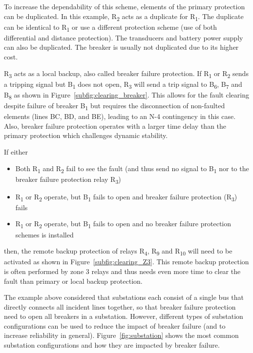 To increase the dependability of this scheme, elements of the primary protection can be duplicated. In this example, R\textsubscript{2} acts as a duplicate for R\textsubscript{1}. The duplicate can be identical to R\textsubscript{1} or use a different protection scheme (\eg use of both differential and distance protection). The transducers and battery power supply can also be duplicated. The breaker is usually not duplicated due to its higher cost.

R\textsubscript{3} acts as a local backup, also called breaker failure protection. If R\textsubscript{1} or R\textsubscript{2} sends a tripping signal but B\textsubscript{1} does not open, R\textsubscript{3} will send a trip signal to B\textsubscript{6}, B\textsubscript{7} and B\textsubscript{8} as shown in Figure~\ref{subfig:clearing_breaker}. This allows for the fault clearing despite failure of breaker B\textsubscript{1} but requires the disconnection of non-faulted elements (lines BC, BD, and BE), leading to an N-4 contingency in this case. Also, breaker failure protection operates with a larger time delay than the primary protection which challenges dynamic stability.

If either

\begin{itemize}
    \item Both R\textsubscript{1} and R\textsubscript{2} fail to see the fault (and thus send no signal to B\textsubscript{1} nor to the breaker failure protection relay R\textsubscript{3})
    \item R\textsubscript{1} or R\textsubscript{2} operate, but B\textsubscript{1} fails to open and breaker failure protection (R\textsubscript{3}) fails
    \item R\textsubscript{1} or R\textsubscript{2} operate, but B\textsubscript{1} fails to open and no breaker failure protection schemes is installed
\end{itemize}
\noindent then, the remote backup protection of relays R\textsubscript{4}, R\textsubscript{9} and R\textsubscript{10} will need to be activated as shown in Figure~\ref{subfig:clearing_Z3}. This remote backup protection is often performed by zone 3 relays and thus needs even more time to clear the fault than primary or local backup protection.

The example above considered that substations each consist of a single bus that directly connects all incident lines together, so that breaker failure protection need to open all breakers in a substation. However, different types of substation configurations can be used to reduce the impact of breaker failure (and to increase reliability in general). Figure~\ref{fig:substation} shows the most common substation configurations and how they are impacted by breaker failure.

